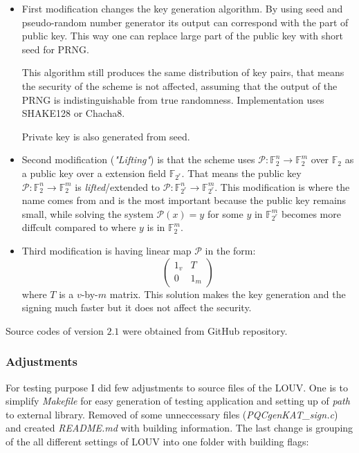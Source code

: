 \documentclass[thesis=M,english]{FITthesis}[2019/12/23]
\begin{document}
\begin{itemize}
\item	First modification changes the key generation algorithm. By using seed and pseudo-random number generator its output can correspond with the part of public key. This way one can replace large part of the public key with short seed for PRNG.

This algorithm still produces the same distribution of key pairs, that means the security of the scheme is not affected, assuming that the output of the PRNG is indistinguishable from true randomness. Implementation uses SHAKE128 or Chacha8.

Private key is also generated from seed.

\item	Second modification (\textit{"Lifting"}) is that the scheme uses $\mathcal{P}:\mathbb{F}_2^n \rightarrow \mathbb{F}_2^m$ over $\mathbb{F}_2$ as a public key over a extension field $\mathbb{F}_{2^r}$. That means the public key $\mathcal{P}:\mathbb{F}_2^n \rightarrow \mathbb{F}_2^m$ is \textit{lifted}/extended to $\mathcal{P}:\mathbb{F}_{2^r}^n \rightarrow \mathbb{F}_{2^r}^m$. This modification is where the name comes from and is the most important because the public key remains small, while solving the system $\mathcal{P}(x) = y$ for some $y$ in $\mathbb{F}_{2^r}^m$ becomes more diffcult compared to where $y$ is in $\mathbb{F}_{2}^m$.\cite{L-LIFTING}

\item	Third modification is having linear map $\mathcal{P}$ in the form:
\begin{equation*}
\begin{pmatrix}
1_v & T\\
0 & 1_m
\end{pmatrix}
\end{equation*}
where $T$ is a $v$-by-$m$ matrix. This solution makes the key generation and the signing much faster\cite{L-CZYP} but it does not affect the security.\cite{L-EQ-KEYS}
\end{itemize}

Source codes of version $2.1$ were obtained from GitHub repository.

\subsubsection{Adjustments}
For testing purpose I did few adjustments to source files of the LOUV. One is to simplify \textit{Makefile} for easy generation of testing application and setting up of \textit{path} to external library. Removed of some unneccessary files (\textit{PQCgenKAT\_sign.c}) and created \textit{README.md} with building information. The last change is grouping of the all different settings of LOUV into one folder with building flags:
\end{document}
